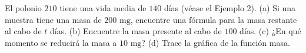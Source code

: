\item El polonio $210$ tiene una vida media de $140$ días (véase el Ejemplo 2). (a) Si una muestra tiene una masa de $200 \text{ mg}$, encuentre una fórmula para la masa restante al cabo de $t$ días. (b) Encuentre la masa presente al cabo de $100$ días. (c) ¿En qué momento se reducirá la masa a $10 \text{ mg}$? (d) Trace la gráfica de la función masa.
